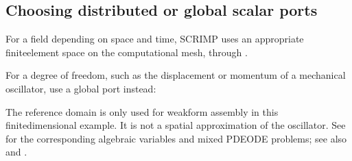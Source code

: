 \documentclass[letterpaper,10pt,english]{sphinxmanual}
\begin{document}
\subsection{Choosing distributed or global scalar ports}
\label{\detokenize{started:choosing-distributed-or-global-scalar-ports}}
\sphinxAtStartPar
For a field depending on space and time, SCRIMP uses an appropriate
finite\sphinxhyphen{}element space on the computational mesh, through
.

\sphinxAtStartPar
For a  degree of freedom, such as the displacement
or momentum of a mechanical oscillator, use a global port instead:

\begin{sphinxVerbatim}[commandchars=\\\{\}]

  
    
    
  
\end{sphinxVerbatim}

\sphinxAtStartPar
The reference domain is only used for weak\sphinxhyphen{}form assembly in this
finite\sphinxhyphen{}dimensional example. It is not a spatial approximation of
the oscillator. See {\hyperref[\detokenize{lumped::doc}]{}} for the corresponding algebraic
variables and mixed PDE\textendash{}ODE problems; see also
{\hyperref[\detokenize{examples/mass_spring_damper::doc}]{}} and
{\hyperref[\detokenize{examples/nonlinear_pendulum::doc}]{}}.
\end{document}
